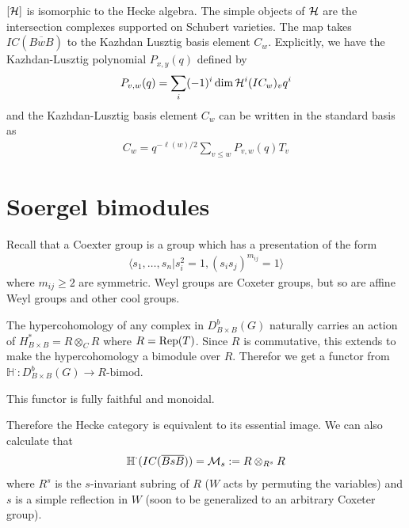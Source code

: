 \documentclass[12pt]{article}
\begin{document}
 \begin{theorem}
    $[{\mathcal{H}}]$ is isomorphic to the Hecke algebra. The simple objects
    of ${\mathcal{H}}$ are the intersection complexes supported on Schubert varieties. The map takes 
    $IC(\overline{BwB})$ to the Kazhdan Lusztig basis element $C_w$. Explicitly, we have
    the Kazhdan-Lusztig polynomial $P_{x,y}(q)$ defined by
    \begin{align*}
        P_{v,w}(q) = \sum_i (-1)^i \dim {\mathcal{H}}^i(IC_w)_v q^i
    \end{align*} and the Kazhdan-Lusztig basis element $C_w$ can be written in the standard
     basis as \begin{align*}
            C_w = q^{-\ell(w)/2}\sum_{v\leq w} P_{v,w}(q) T_v
     \end{align*}
 \end{theorem}

\section{Soergel bimodules}
Recall that a Coexter group is a group which has a presentation of the form
\begin{align*}
    \langle s_1,\ldots,s_n | s_i^2 = 1, (s_is_j)^{m_{ij}} = 1\rangle
\end{align*} where $m_{ij}\geq 2$ are symmetric. Weyl groups are Coxeter groups, but 
so are affine Weyl groups and other cool groups.

\hfill

The hypercohomology of any complex in $D^b_{B\times B}(G)$ naturally 
carries an action of $H^*_{B\times B} = R \otimes_C R$ where $R = \operatorname{Rep}(T)$. Since 
$R$ is commutative, this extends to make the hypercohomology a bimodule over $R$.
Therefor we get a functor from $\mathbb{H}^\cdot: D^b_{B\times B}(G) \to R\text{-bimod}$.

\begin{theorem}
    [Soergel] This functor is fully faithful and monoidal.
\end{theorem} Therefore the Hecke category is equivalent to its essential image.
We can also calculate that \begin{align*}
    \mathbb{H}^\cdot(IC(\overline{BsB})) = {\mathcal{M}}_s := R \otimes_{R^s} R
\end{align*} where $R^s$ is the $s$-invariant subring of $R$ ($W$ acts by permuting the variables)
and $s$ is a simple reflection in $W$ (soon to be generalized to an arbitrary Coxeter group).

\hfill
\end{document}
